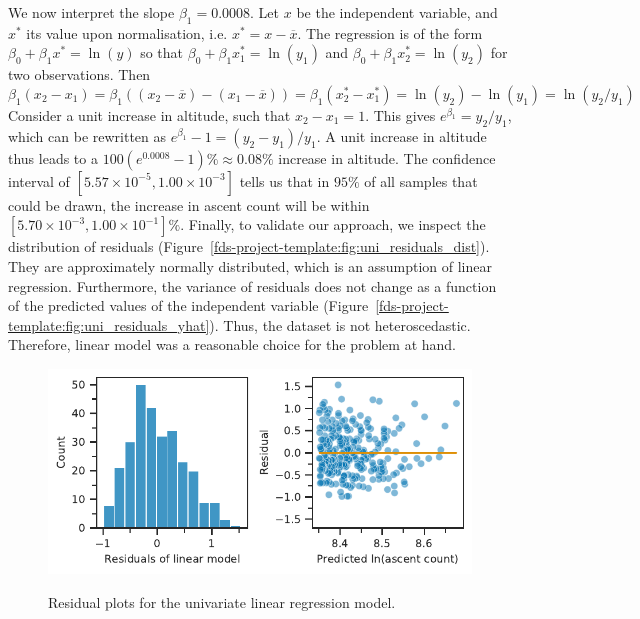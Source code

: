 \documentclass[11pt,a4paper]{article}
\begin{document}
We now interpret the slope $\beta_1=0.0008$. Let $x$ be the independent variable, and $x^*$ its value upon normalisation, i.e. $x^*=x-\overline{x}$. The regression is of the form $\beta_0 + \beta_1x^* = \ln(y)$ so that $\beta_0 + \beta_1x_1^* = \ln(y_1)$ and $\beta_0 + \beta_1x_2^* = \ln(y_2)$ for two observations. Then
$$\beta_1(x_2 - x_1) = \beta_1\left((x_2 - \overline{x}) - (x_1 - \overline{x})\right) = \beta_1(x_2^* - x_1^*)  = \ln(y_2) - \ln(y_1) = \ln(y_2 / y_1)$$
Consider a unit increase in altitude, such that $x_2-x_1=1$. This gives $e^{\beta_1} = y_2 / y_1$, which can be rewritten as $e^{\beta_1} - 1 = (y_2 - y_1) / y_1$. A unit increase in altitude thus leads to a $100(e^{0.0008} - 1)\% \approx 0.08\%$ increase in altitude. The confidence interval of $[5.57 \times 10^{-5}, 1.00\times10^{-3}]$ tells us that in $95\%$ of all samples that could be drawn, the increase in ascent count will be within $[5.70\times10^{-3}, 1.00\times10^{-1}]\%$.
Finally, to validate our approach, we inspect the distribution of residuals (Figure~\ref{fds-project-template:fig:uni_residuals_dist}). They are approximately normally distributed, which is an assumption of linear regression. Furthermore, the variance of residuals does not change as a function of the predicted values of the independent variable (Figure~\ref{fds-project-template:fig:uni_residuals_yhat}). Thus, the dataset is not heteroscedastic. Therefore, linear model was a reasonable choice for the problem at hand.
\begin{figure} [h!]
    \centering
    \includegraphics{report/uni_residuals.pdf}
    \begin{minipage}[t]{.5\linewidth}
        \centering
        \label{fds-project-template:fig:uni_residuals_dist}
    \end{minipage}%
    \begin{minipage}[t]{.5\linewidth}
        \centering
        \label{fds-project-template:fig:uni_residuals_yhat}
    \end{minipage}
    \caption{Residual plots for the univariate linear regression model.}
    \label{fds-project-template:fig:uni_residuals}
\end{figure}
\end{document}
